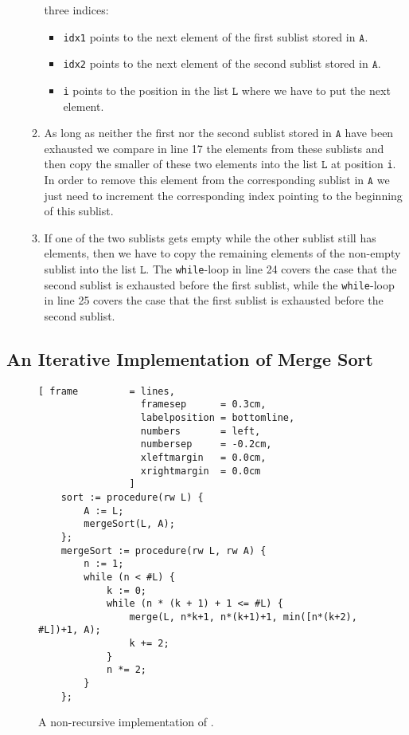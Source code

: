 \begin{enumerate}
\begin{enumerate}
            three indices: 
            \begin{itemize}
            \item \texttt{idx1} points to the next element of the first sublist stored in $\texttt{A}$.
            \item \texttt{idx2} points to the next element of the second sublist stored in $\texttt{A}$.
            \item \texttt{i} points to the position in the list $\texttt{L}$ where we have to put the next
                       element.
            \end{itemize}
      \item As long as neither the first nor the second sublist stored in $\texttt{A}$ have been exhausted
            we compare in line 17 the elements from these sublists and then copy the smaller of these
            two elements into the list $\texttt{L}$ at position \texttt{i}.
            In order to remove this element from the corresponding sublist in $\texttt{A}$ we just need to
            increment the corresponding index pointing to the beginning of this sublist.
      \item If one of the two sublists gets empty while the other sublist still has elements, then we have
            to copy the remaining elements of the non-empty sublist into the list $\texttt{L}$.
            The \texttt{while}-loop in line 24 covers the case that the second sublist is exhausted before 
            the first sublist, while the \texttt{while}-loop in line 25 covers the case that the first
            sublist is exhausted before the second sublist.
      \end{enumerate}
\end{enumerate}

\subsection{An Iterative Implementation of Merge Sort}

\begin{figure}[!ht]
  \centering
\begin{Verbatim}[ frame         = lines, 
                  framesep      = 0.3cm, 
                  labelposition = bottomline,
                  numbers       = left,
                  numbersep     = -0.2cm,
                  xleftmargin   = 0.0cm,
                  xrightmargin  = 0.0cm
                ]
    sort := procedure(rw L) {
        A := L;
        mergeSort(L, A);
    };
    mergeSort := procedure(rw L, rw A) {
        n := 1;
        while (n < #L) {
            k := 0;
            while (n * (k + 1) + 1 <= #L) {
                merge(L, n*k+1, n*(k+1)+1, min([n*(k+2), #L])+1, A);
                k += 2;    
            }
            n *= 2;
        }
    };
\end{Verbatim}
\vspace*{-0.3cm}
  \caption{A non-recursive implementation of .}
  \label{fig:merge-sort-nr.stlx}
\end{figure}

